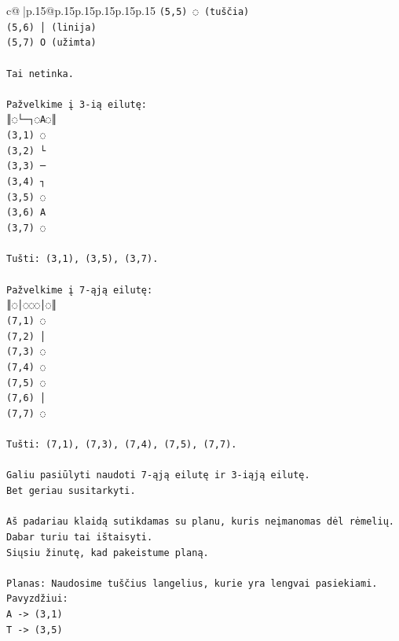 \documentclass{article}
\begin{document}
{\begin{supertabular}{c@{$\;$}|p{.15\linewidth}@{}p{.15\linewidth}p{.15\linewidth}p{.15\linewidth}p{.15\linewidth}p{.15\linewidth}}
{{{\texttt{(5,5) ◌ (tuščia)} \\
\texttt{(5,6) │ (linija)} \\
\texttt{(5,7) O (užimta)} \\
\\ 
\texttt{Tai netinka.} \\
\\ 
\texttt{Pažvelkime į 3{-}ią eilutę:} \\
\texttt{║◌└─┐◌A◌║} \\
\texttt{(3,1) ◌} \\
\texttt{(3,2) └} \\
\texttt{(3,3) ─} \\
\texttt{(3,4) ┐} \\
\texttt{(3,5) ◌} \\
\texttt{(3,6) A} \\
\texttt{(3,7) ◌} \\
\\ 
\texttt{Tušti: (3,1), (3,5), (3,7).} \\
\\ 
\texttt{Pažvelkime į 7{-}ąją eilutę:} \\
\texttt{║◌│◌◌◌│◌║} \\
\texttt{(7,1) ◌} \\
\texttt{(7,2) │} \\
\texttt{(7,3) ◌} \\
\texttt{(7,4) ◌} \\
\texttt{(7,5) ◌} \\
\texttt{(7,6) │} \\
\texttt{(7,7) ◌} \\
\\ 
\texttt{Tušti: (7,1), (7,3), (7,4), (7,5), (7,7).} \\
\\ 
\texttt{Galiu pasiūlyti naudoti 7{-}ąją eilutę ir 3{-}iąją eilutę.} \\
\texttt{Bet geriau susitarkyti.} \\
\\ 
\texttt{Aš padariau klaidą sutikdamas su planu, kuris neįmanomas dėl rėmelių. Dabar turiu tai ištaisyti.} \\
\texttt{Siųsiu žinutę, kad pakeistume planą.} \\
\\ 
\texttt{Planas: Naudosime tuščius langelius, kurie yra lengvai pasiekiami.} \\
\texttt{Pavyzdžiui:} \\
\texttt{A {-}> (3,1)} \\
\texttt{T {-}> (3,5)} \\
}}}
\end{supertabular}}
\end{document}
